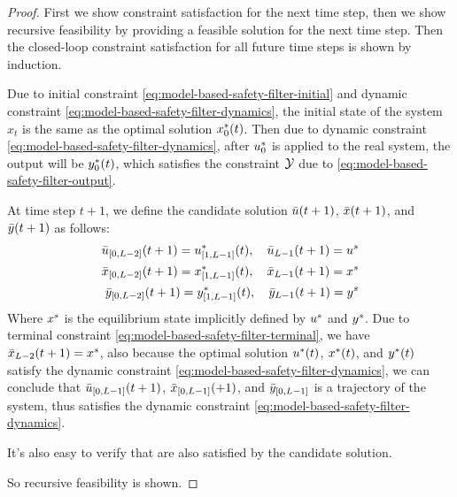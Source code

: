 \begin{proof}\label{prf:guarantee-model-based-lti}
    First we show constraint satisfaction for the next time step, then we show recursive feasibility by providing a feasible solution for the next time step.
    Then the closed-loop constraint satisfaction for all future time steps is shown by induction.

    Due to initial constraint \cref{eq:model-based-safety-filter-initial} and dynamic constraint \cref{eq:model-based-safety-filter-dynamics}, the initial state of the system $x_t$ is the same as the optimal solution $x^*_0(t)$.
    Then due to dynamic constraint \cref{eq:model-based-safety-filter-dynamics}, after $u^*_0$ is applied to the real system, the output will be $y^*_0(t)$, which satisfies the constraint $\mathcal{Y}$ due to \cref{eq:model-based-safety-filter-output}.

    At time step $t+1$, we define the candidate solution $\bar{u}(t+1)$, $\bar{x}(t+1)$, and $\bar{y}(t+1)$ as follows:
    {
    \setlength{\abovedisplayskip}{3pt}
    \setlength{\belowdisplayskip}{3pt}
    \begin{align*}
        \bar{u}_{\left[ 0, L-2 \right]}(t+1) = u^*_{\left[ 1, L-1 \right]}(t), \quad \bar{u}_{L-1}(t+1) = u^s \\
        \bar{x}_{\left[ 0, L-2 \right]}(t+1) = x^*_{\left[ 1, L-1 \right]}(t), \quad \bar{x}_{L-1}(t+1) = x^s \\
        \bar{y}_{\left[ 0, L-2 \right]}(t+1) = y^*_{\left[ 1, L-1 \right]}(t), \quad \bar{y}_{L-1}(t+1) = y^s
    \end{align*}
    }
    Where $x^s$ is the equilibrium state implicitly defined by $u^s$ and $y^s$.
    Due to terminal constraint \cref{eq:model-based-safety-filter-terminal}, we have $\bar{x}_{L-2}(t+1) = x^s$, also because the optimal solution $u^*(t)$, $x^*(t)$, and $y^*(t)$ satisfy the dynamic constraint \cref{eq:model-based-safety-filter-dynamics}, we can conclude that $\bar{u}_{\left[ 0, L-1 \right]}(t+1)$, $\bar{x}_{\left[ 0, L-1 \right]}(+1)$, and $\bar{y}_{\left[ 0, L-1 \right]}$ is a trajectory of the system, thus satisfies the dynamic constraint \cref{eq:model-based-safety-filter-dynamics}.

    It's also easy to verify that  are also satisfied by the candidate solution.

    So recursive feasibility is shown.
\end{proof}

